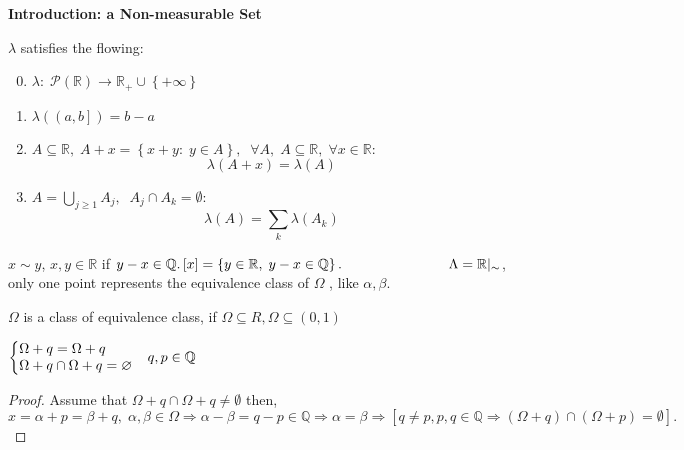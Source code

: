 \setcounter{lecture}{1}

\begin{center}
	\Large \bf Introduction: a Non-measurable Set
\end{center}

\vspace{0.25cm}

$ \lambda $  satisfies the flowing: 
\begin{enumerate}
	\setcounter{enumi}{-1}
	\item $\lambda :\;\mathcal{P}\left( \mathbb{R} \right) \to {\mathbb{R}_ + } \cup \left\{ { + \infty } \right\}$
	\item $\lambda \left( {\left( {a,b} \right]} \right) = b - a$
	\item $A \subseteq \mathbb{R},\;A + x = \left\{ {x + y:\;y \in A} \right\},\;\;\forall A,\;A \subseteq \mathbb{R},\;\forall x \in \mathbb{R} : $
	\begin{equation}
	\lambda \left( {A + x} \right) = \lambda \left( A \right)
	\end{equation}
	\item $A = \bigcup\limits_{j \geqslant 1} {{A_j}} ,\;\;{A_j} \cap {A_k} = \emptyset : $
	\begin{equation}
	\lambda \left( A \right) = \sum\limits_k {\lambda \left( {{A_k}} \right)} 
	\end{equation}
\end{enumerate}


\begin{definition}
	$ x \sim y $,   $ x,y \in \mathbb{R} $ if $ y - x \in \mathbb{Q}. \left[ x \right] = \left\{ {y \in \mathbb{R},\;y - x \in \mathbb{Q}} \right\}. \\
	\text{} \qquad \qquad \qquad \quad  \ \ \Lambda  = \mathbb{R}{|_ \sim }$, only one point represents the equivalence class of $ \Omega $ , like $ \alpha, \beta.$
\end{definition}

$ \Omega $ is a class of equivalence class, if $\Omega  \subseteq R,\Omega  \subseteq \left( {0,1} \right)$

\begin{claim}
	$\left\{ \begin{matrix} 
	\Omega  + q = \Omega  + q \hfill \cr 
	\Omega  + q \cap \Omega  + q = \emptyset  \hfill \cr 
	\end{matrix}  \right.\;\;\;q,p \in \mathbb{Q}$
\end{claim}

\begin{proof}
	Assume that $ \Omega  + q \cap \Omega  + q \ne \emptyset $ then, $x = \alpha  + p = \beta  + q,\;\alpha ,\beta  \in \Omega \Rightarrow \alpha  - \beta  = q - p \in \mathbb{Q} \Rightarrow \alpha  = \beta  \Rightarrow \left[ {q \ne p,p,q \in \mathbb{Q} \Rightarrow \left( {\Omega  + q} \right) \cap \left( {\Omega  + p} \right) = \emptyset } \right].$
\end{proof}

